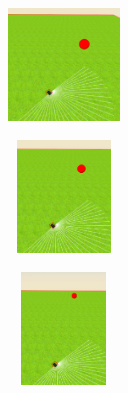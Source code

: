 \begin{figure}[htbp]
\begin{subfigure}[t]{0.2\textwidth}
    \includegraphics[width=3cm, height=3cm]{img/BallPibot1.png}
\label{fig:figure1_1}
\end{subfigure}\hfill
\begin{subfigure}[t]{0.2\textwidth}
  \includegraphics[width=3cm, height=3cm]{img/BallPibot2.png}
\label{fig:figure1_2}
\end{subfigure}\hfill
\begin{subfigure}[t]{0.2\textwidth}
    \includegraphics[width=3cm, height=3cm]{img/BallPibot3.png}
\label{fig:figure1_3}
\end{subfigure}


\end{figure}
